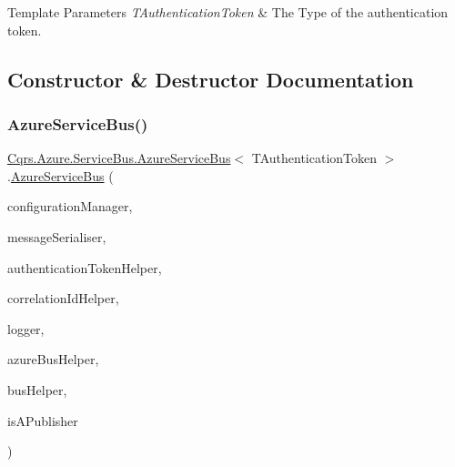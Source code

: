 \begin{DoxyTemplParams}{Template Parameters}
{\em T\+Authentication\+Token} & The Type of the authentication token.\\
\hline
\end{DoxyTemplParams}


\subsection{Constructor \& Destructor Documentation}
\mbox{\label{classCqrs_1_1Azure_1_1ServiceBus_1_1AzureServiceBus_a44845c00c29574c2fa2d43a8a6b124ca_a44845c00c29574c2fa2d43a8a6b124ca}} 
\subsubsection{\texorpdfstring{Azure\+Service\+Bus()}{AzureServiceBus()}}
{\footnotesize\ttfamily \hyperlink{classCqrs_1_1Azure_1_1ServiceBus_1_1AzureServiceBus}{Cqrs.\+Azure.\+Service\+Bus.\+Azure\+Service\+Bus}$<$ T\+Authentication\+Token $>$.\hyperlink{classCqrs_1_1Azure_1_1ServiceBus_1_1AzureServiceBus}{Azure\+Service\+Bus} (\begin{DoxyParamCaption}\item[{\hyperlink{interfaceCqrs_1_1Configuration_1_1IConfigurationManager}{I\+Configuration\+Manager}}]{configuration\+Manager,  }\item[{\hyperlink{interfaceCqrs_1_1Azure_1_1ServiceBus_1_1IMessageSerialiser}{I\+Message\+Serialiser}$<$ T\+Authentication\+Token $>$}]{message\+Serialiser,  }\item[{\hyperlink{interfaceCqrs_1_1Authentication_1_1IAuthenticationTokenHelper}{I\+Authentication\+Token\+Helper}$<$ T\+Authentication\+Token $>$}]{authentication\+Token\+Helper,  }\item[{I\+Correlation\+Id\+Helper}]{correlation\+Id\+Helper,  }\item[{I\+Logger}]{logger,  }\item[{\hyperlink{interfaceCqrs_1_1Azure_1_1ServiceBus_1_1IAzureBusHelper}{I\+Azure\+Bus\+Helper}$<$ T\+Authentication\+Token $>$}]{azure\+Bus\+Helper,  }\item[{\hyperlink{interfaceCqrs_1_1Bus_1_1IBusHelper}{I\+Bus\+Helper}}]{bus\+Helper,  }\item[{bool}]{is\+A\+Publisher }\end{DoxyParamCaption})\hspace{0.3cm}{\ttfamily [protected]}}



